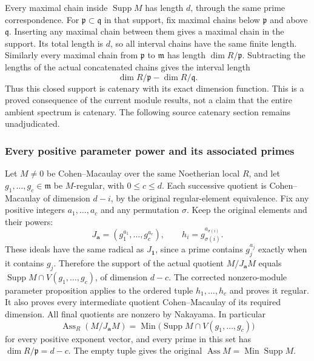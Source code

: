 Every maximal chain inside \(\operatorname{Supp}M\) has length \(d\), through the same prime correspondence. For \(\mathfrak p\subset\mathfrak q\) in that support, fix maximal chains below \(\mathfrak p\) and above \(\mathfrak q\). Inserting any maximal chain between them gives a maximal chain in the support. Its total length is \(d\), so all interval chains have the same finite length. Similarly every maximal chain from \(\mathfrak p\) to \(\mathfrak m\) has length \(\dim R/\mathfrak p\). Subtracting the lengths of the actual concatenated chains gives the interval length \[
 \dim R/\mathfrak p-\dim R/\mathfrak q.
\] Thus this closed support is catenary with its exact dimension function. This is a proved consequence of the current module results, not a claim that the entire ambient spectrum is catenary. The following source catenary section remains unadjudicated.

\subsubsection{Every positive parameter power and its associated primes}\label{algebra-proof-019-every-positive-parameter-power-and-its-associated-primes}

Let \(M\ne0\) be Cohen--Macaulay over the same Noetherian local \(R\), and let \(g_1,\ldots,g_c\in\mathfrak m\) be \(M\)-regular, with \(0\le c\le d\). Each successive quotient is Cohen--Macaulay of dimension \(d-i\), by the original regular-element equivalence. Fix any positive integers \(a_1,\ldots,a_c\) and any permutation \(\sigma\). Keep the original elements and their powers: \[
 J_{\mathbf a}=(g_1^{a_1},\ldots,g_c^{a_c}),\qquad
 h_i=g_{\sigma(i)}^{a_{\sigma(i)}} .
\] These ideals have the same radical as \(J_{\mathbf 1}\), since a prime contains \(g_j^{a_j}\) exactly when it contains \(g_j\). Therefore the support of the actual quotient \(M/J_{\mathbf a}M\) equals \(\operatorname{Supp}M\cap V(g_1,\ldots,g_c)\), of dimension \(d-c\). The corrected nonzero-module parameter proposition applies to the ordered tuple \(h_1,\ldots,h_c\) and proves it regular. It also proves every intermediate quotient Cohen--Macaulay of its required dimension. All final quotients are nonzero by Nakayama. In particular \[
 \operatorname{Ass}_R(M/J_{\mathbf a}M)
 =\operatorname{Min}\bigl(\operatorname{Supp}M\cap V(g_1,\ldots,g_c)\bigr)
\] for every positive exponent vector, and every prime in this set has \(\dim R/\mathfrak p=d-c\). The empty tuple gives the original \(\operatorname{Ass}M=\operatorname{Min}\operatorname{Supp}M\).

